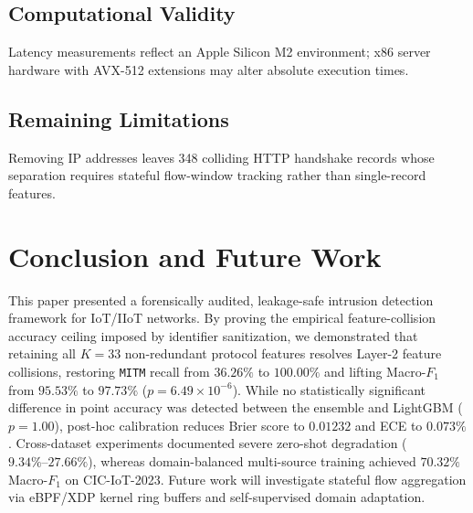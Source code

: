 \documentclass[10pt,journal,twocolumn]{IEEEtran}
\begin{document}
\subsection{Computational Validity}
Latency measurements reflect an Apple Silicon M2 environment; x86 server hardware with AVX-512 extensions may alter absolute execution times.

\subsection{Remaining Limitations}
Removing IP addresses leaves 348 colliding HTTP handshake records whose separation requires stateful flow-window tracking rather than single-record features.

\section{Conclusion and Future Work}
This paper presented a forensically audited, leakage-safe intrusion detection framework for IoT/IIoT networks. By proving the empirical feature-collision accuracy ceiling imposed by identifier sanitization, we demonstrated that retaining all $K=33$ non-redundant protocol features resolves Layer-2 feature collisions, restoring \texttt{MITM} recall from $36.26\%$ to $100.00\%$ and lifting Macro-$F_1$ from $95.53\%$ to $97.73\%$ ($p=6.49\times 10^{-6}$). While no statistically significant difference in point accuracy was detected between the ensemble and LightGBM ($p=1.00$), post-hoc calibration reduces Brier score to $0.01232$ and ECE to $0.073\%$. Cross-dataset experiments documented severe zero-shot degradation ($9.34\%\text{--}27.66\%$), whereas domain-balanced multi-source training achieved $70.32\%$ Macro-$F_1$ on CIC-IoT-2023. Future work will investigate stateful flow aggregation via eBPF/XDP kernel ring buffers and self-supervised domain adaptation.
\end{document}

